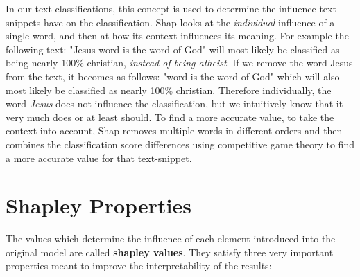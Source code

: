 In our text classifications, this concept is used to determine the influence text-snippets have on the classification. Shap looks at the \textit{individual} influence of a single word, and then at how its context influences its meaning. For example the following text: "Jesus word is the word of God" will most likely be classified as being nearly 100\% christian, \textit{instead of being atheist}. If we remove the word Jesus from the text, it becomes as follows: "word is the word of God" which will also most likely be classified as nearly 100\% christian. Therefore individually, the word \textit{Jesus} does not influence the classification, but we intuitively know that it very much does or at least should. To find a more accurate value, to take the context into account, Shap removes multiple words in different orders and then combines the classification score differences using competitive game theory to find a more accurate value for that text-snippet.

\section{Shapley Properties}
\label{section:shapleyProp}

The values which determine the influence of each element introduced into the original model are called \textbf{shapley values}. They satisfy three very important properties meant to improve the interpretability of the results:

